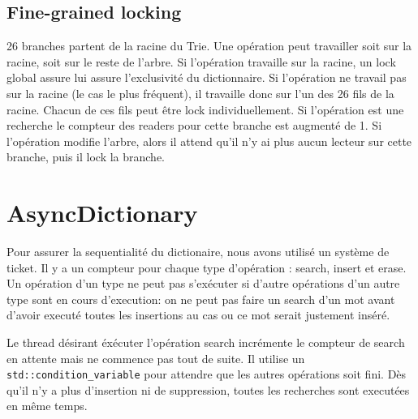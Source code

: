 \documentclass{article}
\begin{document}
\subsection{Fine-grained locking}
26 branches partent de la racine du Trie.
Une opération peut travailler soit sur la racine, soit sur le reste de
l'arbre.
Si l'opération travaille sur la racine, un lock global assure lui assure
l'exclusivité du dictionnaire.
Si l'opération ne travail pas sur la racine (le cas le plus fréquent),
il travaille donc sur l'un des 26 fils de la racine.
Chacun de ces fils peut être lock individuellement.
Si l'opération est une recherche le compteur des readers pour cette
branche est augmenté de 1.
Si l'opération modifie l'arbre, alors il attend qu'il n'y ai plus aucun
lecteur sur cette branche, puis il lock la branche.

\section{AsyncDictionary}
Pour assurer la sequentialité du dictionaire, nous avons utilisé un
système de ticket.
Il y a un compteur pour chaque type d'opération : search, insert et
erase.
Un opération d'un type ne peut pas s'exécuter si d'autre opérations d'un
autre type sont en cours d'execution: on ne peut pas faire un search
d'un mot avant d'avoir executé toutes les insertions au cas ou ce mot
serait justement inséré.

Le thread désirant éxécuter l'opération search incrémente le compteur de
search en attente mais ne commence pas tout de suite.
Il utilise un \texttt{std::condition\_variable} pour attendre que les
autres opérations soit fini.  Dès qu'il n'y a plus d'insertion ni de
suppression, toutes les recherches sont executées en même temps.
\end{document}
